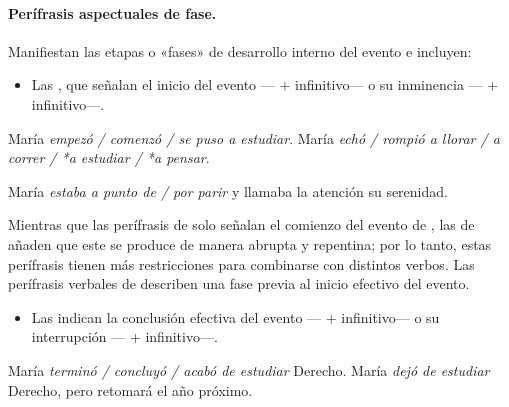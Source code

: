 \paragraph{Perífrasis aspectuales de fase.} Manifiestan las etapas o «fases» de
desarrollo interno del evento e incluyen:

\begin{itemize}
  \item Las , que señalan el inicio del evento
        --- +
        infinitivo--- o su inminencia --- +
        infinitivo---.
\end{itemize}

\begin{exe}
  \ex
    \begin{xlist}
      \ex\label{ex:11-inc-a} María \textit{empezó / comenzó / se puso a
          estudiar}.
      \ex\label{ex:11-inc-b} María \textit{echó / rompió a llorar / a correr /
          *a estudiar / *a pensar}.
    \end{xlist}
  \ex\label{ex:11-parir} María \textit{estaba a punto de / por parir} y llamaba
      la atención su serenidad.
\end{exe}

Mientras que las perífrasis de  solo señalan el comienzo del
evento de , las de  añaden que este se produce
de manera abrupta y repentina; por lo tanto, estas perífrasis tienen más
restricciones para combinarse con distintos verbos. Las perífrasis verbales de
 describen una fase previa al inicio efectivo del evento.

\begin{itemize}
  \item Las  indican la conclusión efectiva del
        evento --- + infinitivo--- o su
        interrupción --- + infinitivo---.
\end{itemize}

\begin{exe}
  \ex
    \begin{xlist}
      \ex\label{ex:11-term-a} María \textit{terminó / concluyó / acabó de
          estudiar} Derecho.
      \ex\label{ex:11-term-b} María \textit{dejó de estudiar} Derecho, pero
          retomará el año próximo.
    \end{xlist}
\end{exe}

